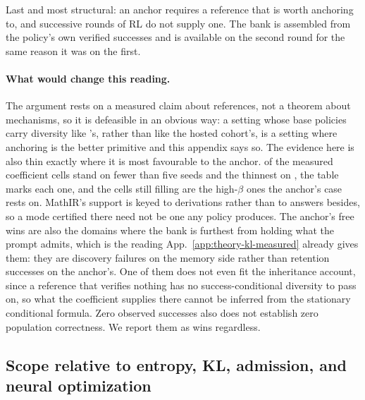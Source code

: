 Last and most structural: an anchor requires a reference that is worth
anchoring to, and successive rounds of RL do not supply one. The bank is
assembled from the policy's own verified successes and is available on the
second round for the same reason it was on the first.

\paragraph{What would change this reading.}
The argument rests on a measured claim about references, not a theorem about
mechanisms, so it is defeasible in an obvious way: a setting whose base
policies carry diversity like \MDklWinDomain{}'s, rather than like the hosted
cohort's, is a setting where anchoring is the better primitive and this
appendix says so.
The evidence here is also thin exactly where it is most favourable to the
anchor. \MDklThinCells{} of the \MDklTotalCells{} measured coefficient cells
stand on fewer than five seeds and the thinnest on \MDklSeedsMin{}, the table
marks each one, and the cells still filling are the high-$\beta$ ones the
anchor's case rests on. MathIR's support is keyed to derivations rather than to
answers besides, so a mode certified there need not be one any policy produces.
The anchor's free wins are also the domains where the bank is furthest from
holding what the prompt admits, which is the reading
App.~\ref{app:theory-kl-measured} already gives them: they are discovery
failures on the memory side rather than retention successes on the anchor's.
One of them does not even fit the inheritance account, since a reference that
verifies nothing has no success-conditional diversity to pass on, so what the
coefficient supplies there cannot be inferred from the stationary
conditional formula. Zero observed successes also does not establish
zero population correctness. We report them as wins regardless.

\subsection{Scope relative to entropy, KL, admission, and neural optimization}
\label{app:theory-entropy}
\label{app:theory-entropy-comparison}

